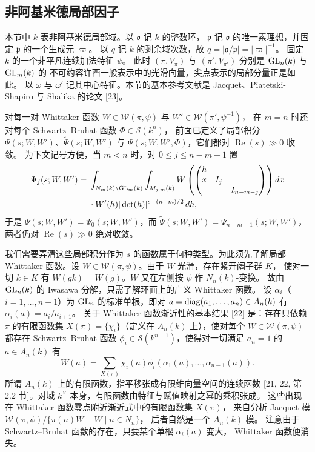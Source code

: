 \subsection{非阿基米德局部因子}

本节中 $k$ 表非阿基米德局部域。以 $\mathfrak{o}$ 记 $k$ 的整数环，
$\mathfrak{p}$ 记 $\mathfrak{o}$ 的唯一素理想，并固定 $\mathfrak{p}$ 的一个生成元 $\varpi$。
以 $q$ 记 $k$ 的剩余域次数，故 $q=|\mathfrak{o}/\mathfrak{p}|=|\varpi|^{-1}$。
固定 $k$ 的一个非平凡连续加法特征 $\psi$。
此时 $(\pi,V_\pi)$ 与 $(\pi',V_{\pi'})$ 分别是 $\mathrm{GL}_n(k)$ 与 $\mathrm{GL}_m(k)$ 的
不可约容许酉一般表示中的光滑向量，尖点表示的局部分量正是如此。
以 $\omega$ 与 $\omega'$ 记其中心特征。本节的基本参考文献是 Jacquet、Piatetski-Shapiro
与 Shalika 的论文 [23]。

对每一对 Whittaker 函数 $W\in\mathcal{W}(\pi,\psi)$ 与 $W'\in\mathcal{W}(\pi',\psi^{-1})$，
在 $m=n$ 时还对每个 Schwartz--Bruhat 函数 $\Phi\in\mathcal{S}(k^n)$，
前面已定义了局部积分 $\Psi(s;W,W')$、$\widetilde{\Psi}(s;W,W')$ 与
$\Psi(s;W,W',\Phi)$，它们都对 $\operatorname{Re}(s)\gg0$ 收敛。
为下文记号方便，当 $m<n$ 时，对 $0\le j\le n-m-1$ 置
\[
\begin{aligned}
\Psi_j(s;W,W')={}&\int_{N_m(k)\backslash\mathrm{GL}_m(k)}\int_{M_{j,m}(k)}
W\left(\begin{pmatrix}h\\x&I_j\\&&I_{n-m-j}\end{pmatrix}\right)dx\\
&\cdot W'(h)|\det(h)|^{s-(n-m)/2}\,dh,
\end{aligned}
\]
于是 $\Psi(s;W,W')=\Psi_0(s;W,W')$，而
$\widetilde{\Psi}(s;W,W')=\Psi_{n-m-1}(s;W,W')$，两者仍对
$\operatorname{Re}(s)\gg0$ 绝对收敛。

我们需要弄清这些局部积分作为 $s$ 的函数属于何种类型。为此须先了解局部
Whittaker 函数。设 $W\in\mathcal{W}(\pi,\psi)$。由于 $W$ 光滑，存在紧开阔子群 $K$，
使对一切 $k\in K$ 有 $W(gk)=W(g)$。$W$ 又在左侧按 $\psi$ 作 $N_n(k)$-变换。
故由 $\mathrm{GL}_n(k)$ 的 Iwasawa 分解，只需了解环面上的广义 Whittaker 函数。
设 $\alpha_i$（$i=1,\ldots,n-1$）为 $\mathrm{GL}_n$ 的标准单根，即对
$a=\operatorname{diag}(a_1,\ldots,a_n)\in A_n(k)$ 有 $\alpha_i(a)=a_i/a_{i+1}$。
关于 Whittaker 函数渐近性的基本结果 [22] 是：存在只依赖 $\pi$ 的有限函数集
$X(\pi)=\{\chi_i\}$（定义在 $A_n(k)$ 上），使对每个 $W\in\mathcal{W}(\pi,\psi)$
都存在 Schwartz--Bruhat 函数 $\phi_i\in\mathcal{S}(k^{n-1})$，使得对一切满足
$a_n=1$ 的 $a\in A_n(k)$ 有
\[
W(a)=\sum_{X(\pi)}\chi_i(a)\phi_i(\alpha_1(a),\ldots,\alpha_{n-1}(a)).
\]
所谓 $A_n(k)$ 上的有限函数，指平移张成有限维向量空间的连续函数
[21, 22, 第 2.2 节]。对域 $k^\times$ 本身，有限函数由特征与赋值映射之幂的乘积张成。
这些出现在 Whittaker 函数零点附近渐近式中的有限函数集 $X(\pi)$，
来自分析 Jacquet 模 $\mathcal{W}(\pi,\psi)/\{\pi(n)W-W\mid n\in N_n\}$，
后者自然是一个 $A_n(k)$-模。
注意由于 Schwartz--Bruhat 函数的存在，只要某个单根 $\alpha_i(a)$ 变大，
Whittaker 函数便消失。

